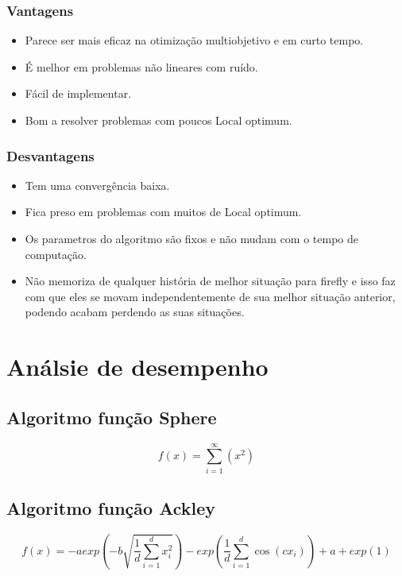 \documentclass[10pt]{article}
\begin{document}
\subsubsection{Vantagens }\label{sec:vantagens}
\begin{itemize}
  \item Parece ser mais eficaz na otimização multiobjetivo e em curto tempo.
  \item É melhor em problemas não lineares com ruído.
  \item Fácil de implementar.
  \item Bom a resolver problemas com poucos Local optimum.
\end{itemize}

\subsubsection{Desvantagens}\label{sec:desvantagens}
\begin{itemize}
  \item Tem uma convergência baixa.
  \item Fica preso em problemas com muitos de Local optimum.
  \item Os parametros do algoritmo são fixos e não mudam com o tempo de computação.
  \item Não memoriza de qualquer história de melhor
  situação para firefly e isso faz com que eles se movam
  independentemente de sua melhor situação anterior, podendo
  acabam perdendo as suas situações.
\end{itemize}
\newpage
\section{Análsie de desempenho}\label{sec:an-do-desem}
\subsection{Algoritmo função Sphere }\label{sec:alg-Sphere}
\begin{equation}
  f(x) = \sum_{i=1}^{\infty}(x^2)
\end{equation}
\subsection{Algoritmo função Ackley }\label{sec:alg-Ackley}
\begin{equation}
  f(x) = -aexp(-b\sqrt{\frac{1}{d}\sum_{i = 1}^{d}x^2_i}) - exp(\frac{1}{d}\sum_{i = 1}^{d}\cos(cx_i)) + a + exp(1)
\end{equation}
\end{document}
